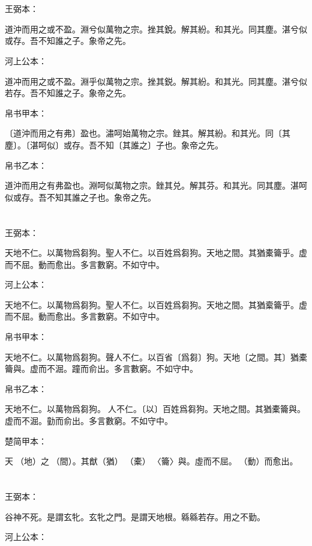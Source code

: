 \documentclass[a5paper]{ctexbook}
\begin{document}
    \chapter{}
    王弼本：

    道沖而用之或不盈。淵兮似萬物之宗。挫其銳。解其紛。和其光。同其塵。湛兮似或存。吾不知誰之子。象帝之先。

    河上公本：

    道冲而用之或不盈。淵乎似萬物之宗。挫其鋭。解其紛。和其光。同其塵。湛兮似若存。吾不知誰之子。象帝之先。

    帛书甲本：

    〔道沖而用之有弗〕盈也。潚呵始萬物之宗。銼其。解其紛。和其光。同〔其塵〕。〔湛呵似〕或存。吾不知〔其誰之〕子也。象帝之先。

    帛书乙本：

    道沖而用之有弗盈也。淵呵似萬物之宗。銼其兑。解其芬。和其光。同其塵。湛呵似或存。吾不知其誰之子也。象帝之先。

    \chapter{}
    王弼本：

    天地不仁。以萬物爲芻狗。聖人不仁。以百姓爲芻狗。天地之間。其猶橐籥乎。虚而不屈。動而愈出。多言數窮。不如守中。

    河上公本：

    天地不仁。以萬物爲芻狗。聖人不仁。以百姓爲芻狗。天地之間。其猶槖籥乎。虚而不屈。動而愈出。多言數窮。不如守中。

    帛书甲本：

    天地不仁。以萬物爲芻狗。聲人不仁。以百省〔爲芻〕狗。天地〔之間。其〕猶橐籥與。虚而不淈。蹱而俞出。多言數窮。不如守中。

    帛书乙本：

    天地不仁。以萬物爲芻狗。𦔻人不仁。〔以〕百姓爲芻狗。天地之間。其猶橐籥與。虚而不淈。勭而俞出。多言數窮。不如守中。

    楚简甲本：

    天󶴵（地）之󶵁（間）。其猷（猶）󶵂（橐）󶵃〈籥〉與。虛而不屈。󶴠（動）而愈出。

    \chapter{}
    王弼本：

    谷神不死。是謂玄牝。玄牝之門。是謂天地根。緜緜若存。用之不勤。

    河上公本：
\end{document}
